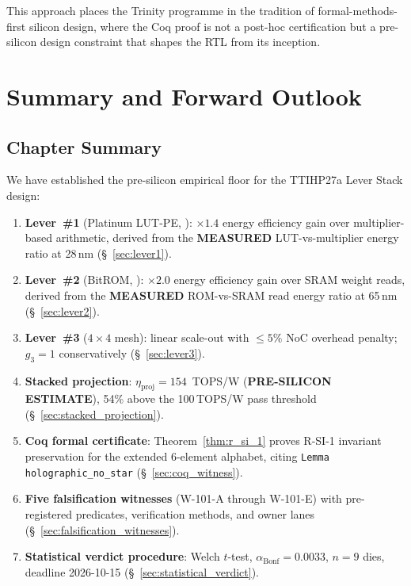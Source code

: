This approach places the Trinity programme in the tradition of
formal-methods-first silicon design, where the Coq proof is not a post-hoc
certification but a pre-silicon design constraint that shapes the RTL from
its inception.

\section{Summary and Forward Outlook}
\label{sec:summary}

\subsection{Chapter Summary}

We have established the pre-silicon empirical floor for the TTIHP27a
Lever Stack design:

\begin{enumerate}
  \item \textbf{Lever~\#1} (Platinum LUT-PE, \cite{platinum_lut_pe_2026}):
    \(\times 1.4\) energy efficiency gain over multiplier-based arithmetic,
    derived from the \textbf{MEASURED} LUT-vs-multiplier energy ratio at 28\,nm
    (\S~\ref{sec:lever1}).

  \item \textbf{Lever~\#2} (BitROM, \cite{bitrom_2025}):
    \(\times 2.0\) energy efficiency gain over SRAM weight reads,
    derived from the \textbf{MEASURED} ROM-vs-SRAM read energy ratio at 65\,nm
    (\S~\ref{sec:lever2}).

  \item \textbf{Lever~\#3} (\(4\times4\) mesh): linear scale-out with
    \(\leq 5\%\) NoC overhead penalty; \(g_{3} = 1\) conservatively
    (\S~\ref{sec:lever3}).

  \item \textbf{Stacked projection}: \(\eta_{\mathrm{proj}} = 154\)~TOPS/W
    (\textbf{PRE-SILICON ESTIMATE}), 54\% above the 100\,TOPS/W pass threshold
    (\S~\ref{sec:stacked_projection}).

  \item \textbf{Coq formal certificate}: Theorem~\ref{thm:r_si_1} proves
    R-SI-1 invariant preservation for the extended 6-element alphabet,
    citing \texttt{Lemma holographic\_no\_star} (\S~\ref{sec:coq_witness}).

  \item \textbf{Five falsification witnesses} (W-101-A through W-101-E)
    with pre-registered predicates, verification methods, and owner lanes
    (\S~\ref{sec:falsification_witnesses}).

  \item \textbf{Statistical verdict procedure}: Welch \(t\)-test,
    \(\alpha_{\mathrm{Bonf}} = 0.0033\), \(n = 9\) dies,
    deadline 2026-10-15 (\S~\ref{sec:statistical_verdict}).
\end{enumerate}

